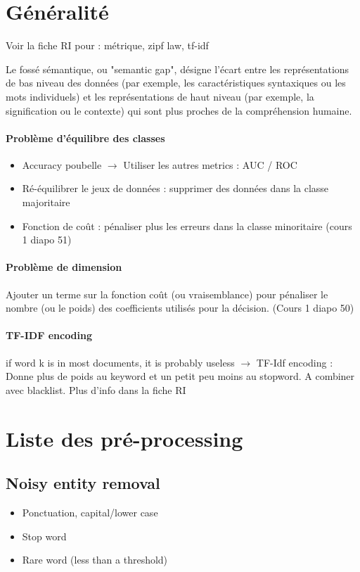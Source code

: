 \documentclass{article}
\begin{document}
\footnotesize
\begin{multicols}{2}

    \section{Généralité}
    Voir la fiche RI pour : métrique, zipf law, tf-idf

    Le fossé sémantique, ou "semantic gap", désigne l'écart entre les représentations de bas niveau des données (par exemple, les caractéristiques syntaxiques ou les mots individuels) et les représentations de haut niveau (par exemple, la signification ou le contexte) qui sont plus proches de la compréhension humaine. 

    \paragraph*{Problème d'équilibre des classes}
    \begin{itemize}
        \item Accuracy poubelle $\rightarrow$ Utiliser les autres metrics : AUC / ROC
        \item Ré-équilibrer le jeux de données : supprimer des données dans la classe majoritaire 
        \item Fonction de coût : pénaliser plus les erreurs dans la classe minoritaire (cours 1 diapo 51)
    \end{itemize}

    \paragraph*{Problème de dimension}
    Ajouter un terme sur la fonction coût (ou vraisemblance) pour pénaliser le nombre (ou le poids) des coefficients utilisés pour la décision. (Cours 1 diapo 50)

    \paragraph*{TF-IDF encoding} if word k is in most documents, it is probably useless $\rightarrow$ TF-Idf encoding : Donne plus de poids au keyword et un petit peu moins au stopword. A combiner avec blacklist. Plus d'info dans la fiche RI
    
    \section{Liste des pré-processing}
    \subsection{Noisy entity removal}
    \begin{itemize}
        \item Ponctuation, capital/lower case
        \item Stop word 
        \item Rare word (less than a threshold)
    \end{itemize}
    

\end{multicols}
\end{document}
